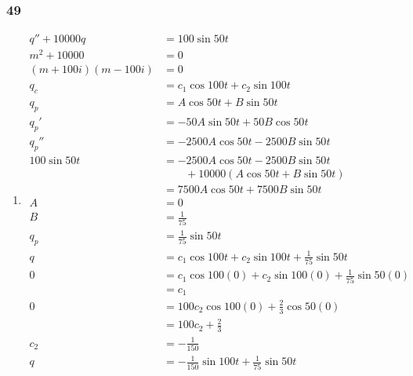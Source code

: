 \documentclass{article}
\begin{document}
\subsubsection{49}

\begin{enumerate}
  \item

        \begin{align*}
          q'' + 10000 q         & = 100 \sin 50 t                                                  \\
          m^2 + 10000           & = 0                                                              \\
          (m + 100i) (m - 100i) & = 0                                                              \\
          q_c                   & = c_1 \cos 100 t + c_2 \sin 100 t                                \\
          q_p                   & = A \cos 50 t + B \sin 50 t                                      \\
          q_p'                  & = -50 A \sin 50 t + 50 B \cos 50 t                               \\
          q_p''                 & = -2500 A \cos 50 t - 2500 B \sin 50 t                           \\
          100 \sin 50 t         & = -2500 A \cos 50 t - 2500 B \sin 50 t                           \\
                                & \qquad + 10000 (A \cos 50 t + B \sin 50 t)                       \\
                                & = 7500 A \cos 50 t + 7500 B \sin 50 t                            \\
          A                     & = 0                                                              \\
          B                     & = \frac{1}{75}                                                   \\
          q_p                   & = \frac{1}{75} \sin 50 t                                         \\
          q                     & = c_1 \cos 100 t + c_2 \sin 100 t + \frac{1}{75} \sin 50 t       \\
          0                     & = c_1 \cos 100 (0) + c_2 \sin 100 (0) + \frac{1}{75} \sin 50 (0) \\
                                & = c_1                                                            \\
          0                     & = 100 c_2 \cos 100 (0) + \frac{2}{3} \cos 50 (0)                 \\
                                & = 100 c_2 + \frac{2}{3}                                          \\
          c_2                   & = -\frac{1}{150}                                                 \\
          q                     & = -\frac{1}{150} \sin 100 t + \frac{1}{75} \sin 50 t
        \end{align*}


\end{enumerate}
\end{document}
